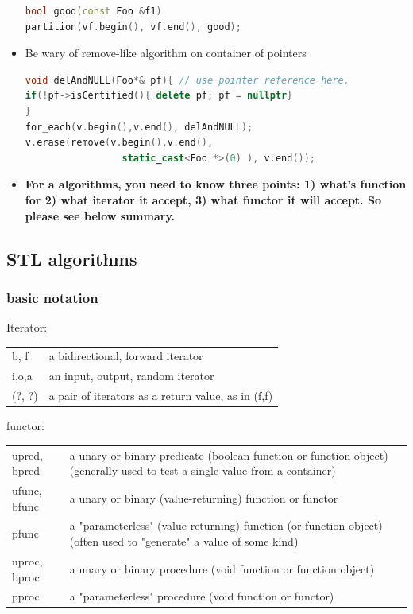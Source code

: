 \documentclass[a4paper,11pt,twoside]{book}
\renewcommand{\hline}{}
\begin{document}
\begin{itemize}
\begin{lstlisting}[frame=single, language=c++]
bool good(const Foo &f1)
partition(vf.begin(), vf.end(), good);
\end{lstlisting}

\item Be wary of remove-like algorithm on container of pointers
\begin{lstlisting}[frame=single, language=c++]
void delAndNULL(Foo*& pf){ // use pointer reference here.
if(!pf->isCertified(){ delete pf; pf = nullptr}
}
for_each(v.begin(),v.end(), delAndNULL);
v.erase(remove(v.begin(),v.end(),
                 static_cast<Foo *>(0) ), v.end());
\end{lstlisting}


\item \textbf{For a algorithms, you need to know three points: 1) what's function  for 2) what iterator it accept, 3) what functor it will accept.  So please see below summary. }
\end{itemize}

\subsection{STL algorithms}
\subsubsection{basic notation}



Iterator:  \\
\begin{tabular}{| p{} |p{}|}
\hline b, f &	a bidirectional, forward iterator \\
\hline i,o,a 	&an input, output, random iterator  \\
\hline(?, ?)	&a pair of iterators as a return value, as in (f,f)  \\
\hline
\end{tabular}

functor:  \\
\begin{tabular}{| p{} |p{}|}
\hline upred, bpred	& a unary or binary predicate (boolean function or function object)
(generally used to test a single value from a container) \\

\hline ufunc, bfunc	&  a unary or binary  (value-returning) function or functor \\
\hline pfunc	& a "parameterless" (value-returning) function (or function object)
(often used to "generate" a value of some kind) \\
\hline uproc, bproc	& a unary or binary  procedure (void function or function object) \\
\hline pproc	&  a "parameterless" procedure (void function or functor) \\
\hline
\end{tabular}
\end{document}
